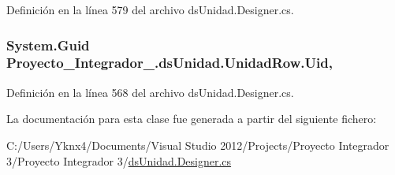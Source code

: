 Definición en la línea 579 del archivo ds\-Unidad.\-Designer.\-cs.

\hypertarget{class_proyecto___integrador__3_1_1ds_unidad_1_1_unidad_row_ab7854a6f12858fc9c8de66c59b342863}{
\subsubsection[{Uid}]{\setlength{\rightskip}{0pt plus 5cm}System.\-Guid Proyecto\-\_\-\-Integrador\-\_.\-ds\-Unidad.\-Unidad\-Row.\-Uid\hspace{0.3cm}{\ttfamily [get]}, {\ttfamily [set]}}}\label{class_proyecto___integrador__3_1_1ds_unidad_1_1_unidad_row_ab7854a6f12858fc9c8de66c59b342863}


Definición en la línea 568 del archivo ds\-Unidad.\-Designer.\-cs.



La documentación para esta clase fue generada a partir del siguiente fichero\-:\begin{DoxyCompactItemize}
\item 
C\-:/\-Users/\-Yknx4/\-Documents/\-Visual Studio 2012/\-Projects/\-Proyecto Integrador 3/\-Proyecto Integrador 3/\hyperlink{ds_unidad_8_designer_8cs}{ds\-Unidad.\-Designer.\-cs}\end{DoxyCompactItemize}
